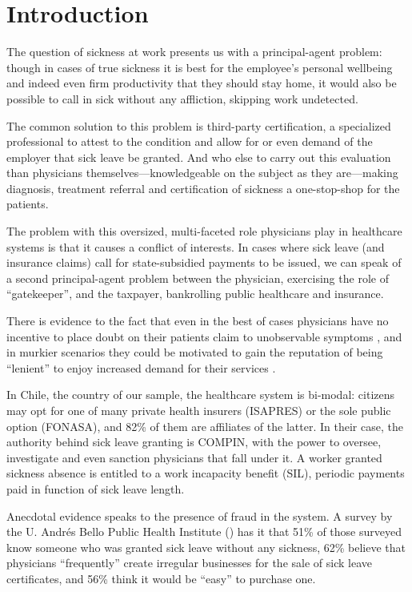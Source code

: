 \documentclass[../main.tex]{subfiles}
\begin{document}
\section{Introduction}

The question of sickness at work presents us with a principal-agent problem: though in cases of true sickness it is best for the employee's personal wellbeing and indeed even firm productivity \citep{productivity} that they should stay home, it would also be possible to call in sick without any affliction, skipping work undetected.

The common solution to this problem is third-party certification, a specialized professional to attest to the condition and allow for or even demand of the employer that sick leave be granted. And who else to carry out this evaluation than physicians themselves—knowledgeable on the subject as they are—making diagnosis, treatment referral and certification of sickness a one-stop-shop for the patients.

The problem with this oversized, multi-faceted role physicians play in healthcare systems is that it causes a conflict of interests. In cases where sick leave (and insurance claims) call for state-subsidied payments to be issued, we can speak of a second principal-agent problem between the physician, exercising the role of ``gatekeeper'', and the taxpayer, bankrolling public healthcare and insurance.

There is evidence to the fact that even in the best of cases physicians have no incentive to place doubt on their patients claim to unobservable symptoms \citep{cln}, and in murkier scenarios they could be motivated to gain the reputation of being ``lenient'' to enjoy increased demand for their services \citep{markussen-roed}.

In Chile, the country of our sample, the healthcare system is bi-modal: citizens may opt for one of many private health insurers (ISAPRES) or the sole public option (FONASA), and 82\% of them are affiliates of the latter. In their case, the authority behind sick leave granting is COMPIN, with the power to oversee, investigate and even sanction physicians that fall under it. A worker granted sickness absence is entitled to a work incapacity benefit (SIL), periodic payments paid in function of sick leave length.

Anecdotal evidence speaks to the presence of fraud in the system. A survey by the U. Andrés Bello Public Health Institute (\citeyear{unab}) has it that 51\% of those surveyed know someone who was granted sick leave without any sickness, 62\% believe that physicians ``frequently'' create irregular businesses for the sale of sick leave certificates, and 56\% think it would be ``easy'' to purchase one.
\end{document}
